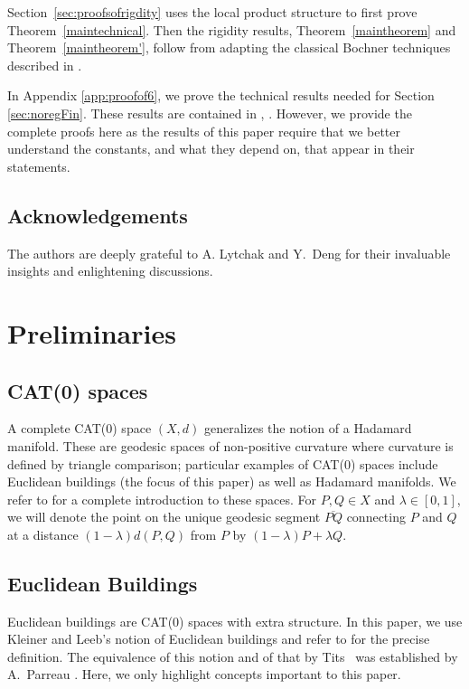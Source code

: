 \documentclass[12pt]{amsart}
\theoremstyle{definition}
\numberwithin{equation}{section}
\begin{document}
 
 Section~\ref{sec:proofsofrigdity} uses the local product structure to first prove Theorem~\ref{maintechnical}.  Then the  rigidity results, Theorem~\ref{maintheorem} and Theorem~\ref{maintheorem'}, follow from adapting the classical Bochner techniques described in \cite{gromov-schoen}. 
 
 In Appendix \ref{app:proofof6}, we prove the technical results needed for Section \ref{sec:noregFin}. These results are contained in \cite{gromov-schoen}, \cite{sun}. However, we provide the complete proofs here as the results of this paper require that we better understand the constants, and what they depend on, that appear in their statements.




\subsection*{Acknowledgements} The authors are deeply grateful to A. Lytchak and Y.~Deng for their invaluable insights and enlightening discussions. \\

\tableofcontents





\section{Preliminaries}\label{sec:prelim}

\subsection{CAT(0) spaces}\label{CAT0sec}
A complete CAT(0) space $(X,d)$ generalizes the notion of a Hadamard manifold.  These are geodesic spaces of non-positive curvature where curvature is defined by triangle comparison; particular examples of CAT(0) spaces include Euclidean buildings (the focus of this paper) as well as Hadamard manifolds.  We refer to \cite{bridson-haefliger} for a complete introduction to these spaces.  {For  $P,Q \in X$ and $\lambda \in [0,1]$, we will denote the point on the unique geodesic segment $\overline{PQ}$ connecting $P$ and $Q$ at a distance   $(1-\lambda)d(P,Q)$ from $P$ by 
$
(1-\lambda)P + \lambda Q.
$
}

\subsection{Euclidean Buildings} Euclidean buildings are CAT(0) spaces with extra structure.
In this paper, we use Kleiner and Leeb's notion of Euclidean buildings and refer to \cite{kleiner-leeb} for the precise definition.    The equivalence of this notion and of that   by Tits~\cite{tits} was established by A.~Parreau \cite{parreau}. Here, we only highlight concepts important to this paper.    
\end{document}
